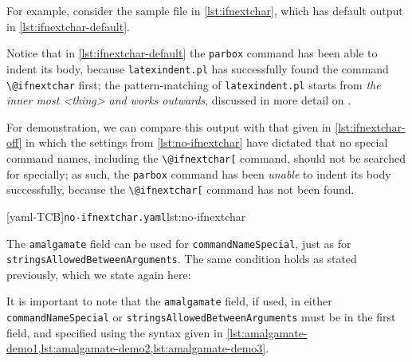  \begin{example}
 For example, consider the sample file in \cref{lst:ifnextchar}, which has default output
 in \cref{lst:ifnextchar-default}.

 \begin{cmhtcbraster}[raster column skip=.1\linewidth]
 \end{cmhtcbraster}

 Notice that in \cref{lst:ifnextchar-default} the \texttt{parbox} command has been able
 to indent its body, because \texttt{latexindent.pl} has successfully found the command
 \lstinline!\@ifnextchar! first; the pattern-matching of \texttt{latexindent.pl} starts
 from \emph{the inner most <thing> and works outwards}, discussed in more detail on
 .

 For demonstration, we can compare this output with that given in
 \cref{lst:ifnextchar-off} in which the settings from \cref{lst:no-ifnextchar} have
 dictated that no special command names, including the \lstinline!\@ifnextchar[! command,
 should not be searched for specially; as such, the \texttt{parbox} command has been
 \emph{unable} to indent its body successfully, because the \lstinline!\@ifnextchar[!
 command has not been found.

 \begin{cmhtcbraster}[raster column skip=.1\linewidth]
  [yaml-TCB]{\texttt{no-ifnextchar.yaml}}{lst:no-ifnextchar}
 \end{cmhtcbraster}
 \end{example}

 The \texttt{amalgamate} field can be used for \texttt{commandNameSpecial}, just as for
 \texttt{stringsAllowedBetweenArguments}. The same condition holds as stated previously,
 which we state again here: 

 \begin{warning}
  It is important to note that the \texttt{amalgamate} field, if used, in either
  \texttt{commandNameSpecial} or \texttt{stringsAllowedBetweenArguments} must be in the
  first field, and specified using the syntax given in
  \cref{lst:amalgamate-demo1,lst:amalgamate-demo2,lst:amalgamate-demo3}.
 \end{warning}
